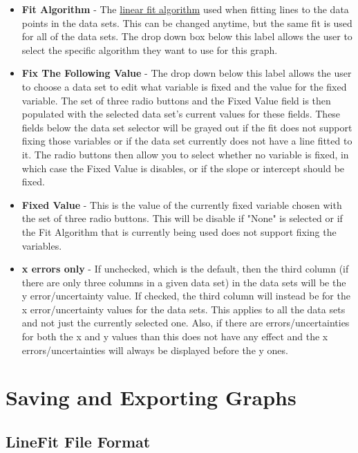 \documentclass[titlepage,12pt]{article}
\begin{document}
\begin{itemize}
\item \textbf{Fit Algorithm} - The \hyperref[sec:algorithms]{linear fit algorithm} used when fitting lines to the data points in the data sets. This can be changed anytime, but the same fit is used for all of the data sets. The drop down box below this label allows the user to select the specific algorithm they want to use for this graph.
\item \textbf{Fix The Following Value} - The drop down below this label allows the user to choose a data set to edit what variable is fixed and the value for the fixed variable. The set of three radio buttons and the Fixed Value field is then populated with the selected data set's current values for these fields. These fields below the data set selector will be grayed out if the fit does not support fixing those variables or if the data set currently does not have a line fitted to it. The radio buttons then allow you to select whether no variable is fixed, in which case the Fixed Value is disables, or if the slope or intercept should be fixed.
\item \textbf{Fixed Value} - This is the value of the currently fixed variable chosen with the set of three radio buttons. This will be disable if "None" is selected or if the Fit Algorithm that is currently being used does not support fixing the variables.
\item \textbf{x errors only} - If unchecked, which is the default, then the third column (if there are only three columns in a given data set) in the data sets will be the y error/uncertainty value. If checked, the third column will instead be for the x error/uncertainty values for the data sets. This applies to all the data sets and not just the currently selected one. Also, if there are errors/uncertainties for both the x and y values than this does not have any effect and the x errors/uncertainties will always be displayed before the y ones.
\end{itemize}



\section{Saving and Exporting Graphs}



\subsection{LineFit File Format}
\end{document}
